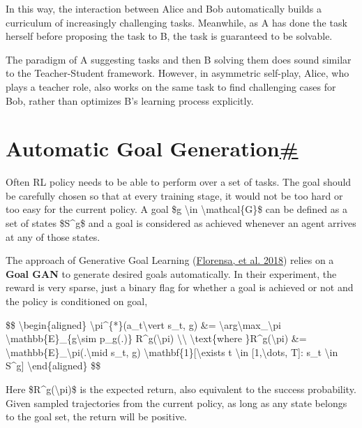 In this way, the interaction between Alice and Bob automatically builds a curriculum of increasingly challenging tasks. Meanwhile, as A has done the task herself before proposing the task to B, the task is guaranteed to be solvable.

The paradigm of A suggesting tasks and then B solving them does sound similar to the Teacher-Student framework. However, in asymmetric self-play, Alice, who plays a teacher role, also works on the same task to find challenging cases for Bob, rather than optimizes B's learning process explicitly.

\section{\texorpdfstring{Automatic Goal Generation\hyperref[automatic-goal-generation]{\#}}{Automatic Goal Generation\#}}\label{automatic-goal-generation}

Often RL policy needs to be able to perform over a set of tasks. The goal should be carefully chosen so that at every training stage, it would not be too hard or too easy for the current policy. A goal \$g \textbackslash in \textbackslash mathcal\{G\}\$ can be defined as a set of states \$S\^{}g\$ and a goal is considered as achieved whenever an agent arrives at any of those states.

The approach of Generative Goal Learning (\href{https://arxiv.org/abs/1705.06366}{Florensa, et al. 2018}) relies on a \textbf{Goal GAN} to generate desired goals automatically. In their experiment, the reward is very sparse, just a binary flag for whether a goal is achieved or not and the policy is conditioned on goal,

\$\$ \textbackslash begin\{aligned\} \textbackslash pi\^{}\{*\}(a\_t\textbackslash vert s\_t, g) \&= \textbackslash arg\textbackslash max\_\textbackslash pi \textbackslash mathbb\{E\}\_\{g\textbackslash sim p\_g(.)\} R\^{}g(\textbackslash pi) \textbackslash\textbackslash{} \textbackslash text\{where \}R\^{}g(\textbackslash pi) \&= \textbackslash mathbb\{E\}\_\textbackslash pi(.\textbackslash mid s\_t, g) \textbackslash mathbf\{1\}{[}\textbackslash exists t \textbackslash in {[}1,\textbackslash dots, T{]}: s\_t \textbackslash in S\^{}g{]} \textbackslash end\{aligned\} \$\$

Here \$R\^{}g(\textbackslash pi)\$ is the expected return, also equivalent to the success probability. Given sampled trajectories from the current policy, as long as any state belongs to the goal set, the return will be positive.

